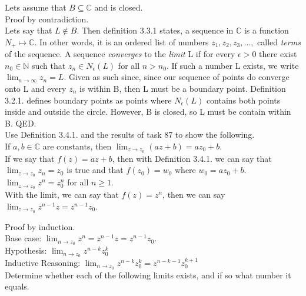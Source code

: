 \documentclass[12pt]{article}
\begin{document}
Lets assume that $B \subseteq \mathbb{C}$ and is closed.\\

Proof by contradiction.\\
Lets say that $L \not\in B$.
Then definition 3.3.1 states, a sequence in $\mathbb{C}$ is a function $N_+ \mapsto \mathbb{C}$. In other words, it is an ordered list of numbers $z_1,z_2,z_3,...,$ called \textit{terms} of the sequence. 
A sequence \textit{converges} to the \textit{limit} L if for every $\epsilon > 0$ there exist $n_0 \in \mathbb{N}$ such that $z_n \in N_{\epsilon}(L)$ for all $n > n_0$. 
If such a number L exists, we write $\lim_{n\to\infty} z_n = L$.
Given as such since, since our sequence of points do converge onto L and every $z_n$ is within B, then L must be a boundary point.
Definition 3.2.1. defines boundary points as points where $N_{\epsilon}(L)$ contains both points inside and outside the circle.
However, B is closed, so L must be contain within B.
QED.\\


 Use Definition 3.4.1. and the results of task 87 to show the following.\\

 If $a,b \in \mathbb{C}$ are constants, then $\lim_{z \to z_0} (az+b) = az_0 + b$.\\

If we say that $f(z) = az + b$, then with Definition 3.4.1. we can say that $\lim_{z\to z_0} z_n = z_0$ is true and that $f(z_0) = w_0$ where $w_0 = az_0 + b$.\\

 $\lim_{z \to z_0} z^n = z^{n}_{0}$ for all $n \geq 1$.\\

With the limit, we can say that $f(z) = z^n$, then we can say $\lim_{z\to z_0} z^{n-1}z = z^{n-1}z_0$.

Proof by induction.\\

Base case: $\lim_{n\to z_0} z^n = z^{n-1}z = z^{n-1}z_0$.\\
Hypothesis: $\lim_{n \to z_0} z^{n-k}z^k_0$\\
Inductive Reasoning: $\lim_{n \to z_0} z^{n-k}z^k_0 = z^{n-k-1}z^{k+1}_0$\\


 Determine whether each of the following limits exists, and if so what number it equals.\\
\end{document}
